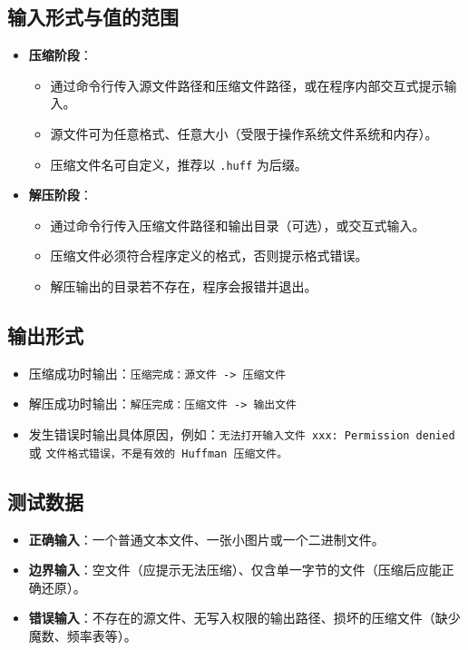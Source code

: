 \documentclass[UTF8]{ctexart}
\begin{document}
\subsection{输入形式与值的范围}
\begin{itemize}
    \item \textbf{压缩阶段}：
        \begin{itemize}
            \item 通过命令行传入源文件路径和压缩文件路径，或在程序内部交互式提示输入。
            \item 源文件可为任意格式、任意大小（受限于操作系统文件系统和内存）。
            \item 压缩文件名可自定义，推荐以 \texttt{.huff} 为后缀。
        \end{itemize}
    \item \textbf{解压阶段}：
        \begin{itemize}
            \item 通过命令行传入压缩文件路径和输出目录（可选），或交互式输入。
            \item 压缩文件必须符合程序定义的格式，否则提示格式错误。
            \item 解压输出的目录若不存在，程序会报错并退出。
        \end{itemize}
\end{itemize}

\subsection{输出形式}
\begin{itemize}
    \item 压缩成功时输出：\texttt{压缩完成：源文件 -> 压缩文件}
    \item 解压成功时输出：\texttt{解压完成：压缩文件 -> 输出文件}
    \item 发生错误时输出具体原因，例如：\texttt{无法打开输入文件 xxx: Permission denied} 或 \texttt{文件格式错误，不是有效的 Huffman 压缩文件。}
\end{itemize}

\subsection{测试数据}
\begin{itemize}
    \item \textbf{正确输入}：一个普通文本文件、一张小图片或一个二进制文件。
    \item \textbf{边界输入}：空文件（应提示无法压缩）、仅含单一字节的文件（压缩后应能正确还原）。
    \item \textbf{错误输入}：不存在的源文件、无写入权限的输出路径、损坏的压缩文件（缺少魔数、频率表等）。
\end{itemize}
\end{document}
